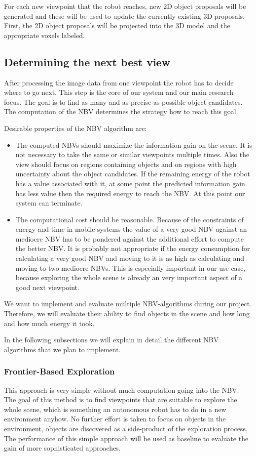 \documentclass[a4paper,11pt,english]{article}
\begin{document}
For each new viewpoint that the robot reaches, new 2D object proposals will be generated and these will be used to update the currently existing 3D proposals.
First, the 2D object proposals will be projected into the 3D model and the appropriate voxels labeled.

\subsection{Determining the next best view}
\label{system:nbv}
After processing the image data from one viewpoint the robot has to decide where to go next.
This step is the core of our system and our main research focus.
The goal is to find as many and as precise as possible object candidates.
The computation of the NBV determines the strategy how to reach this goal.

Desirable properties of the NBV algorithm are:
\begin{itemize}
	\item The computed NBVs should maximize the information gain on the scene. It is not necessary to take the same or similar viewpoints multiple times. Also the view should focus on regions containing objects and on regions with high uncertainty about the object candidates. If the remaining energy of the robot has a value associated with it, at some point the predicted information gain has less value then the required energy to reach the NBV. At this point our system can terminate.
	\item The computational cost should be reasonable. Because of the constraints of energy and time in mobile systems the value of a very good NBV against an mediocre NBV has to be pondered against the additional effort to compute the better NBV. It is probably not appropriate if the energy consumption for calculating a very good NBV and moving to it is as high as calculating and moving to two mediocre NBVs. This is especially important in our use case, because exploring the whole scene is already an very important aspect of a good next viewpoint.
\end{itemize}

We want to implement and evaluate multiple NBV-algorithms during our project.
Therefore, we will evaluate their ability to find objects in the scene and how long and how much energy it took.

In the following subsections we will explain in detail the different NBV algorithms that we plan to implement.

\subsubsection{Frontier-Based Exploration}
This approach is very simple without much computation going into the NBV.
The goal of this method is to find viewpoints that are suitable to explore the whole scene, which is something an autonomous robot has to do in a new environment anyhow.
No further effort is taken to focus on objects in the environment, objects are discovered as a side-product of the exploration process.
The performance of this simple approach will be used as baseline to evaluate the gain of more sophisticated approaches.
\end{document}
